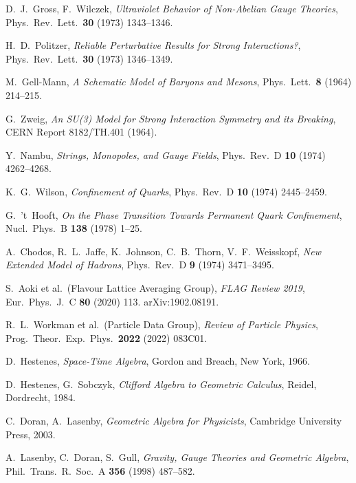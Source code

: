 \documentclass[11pt,a4paper]{article}
\theoremstyle{definition}
\theoremstyle{plain}
\theoremstyle{remark}
\begin{document}
\begin{thebibliography}{99}\setlength{\itemsep}{3pt}

D.~J.~Gross, F.~Wilczek, \emph{Ultraviolet Behavior of Non-Abelian Gauge Theories}, Phys.\ Rev.\ Lett.\ \textbf{30} (1973) 1343--1346.

H.~D.~Politzer, \emph{Reliable Perturbative Results for Strong Interactions?}, Phys.\ Rev.\ Lett.\ \textbf{30} (1973) 1346--1349.

M.~Gell-Mann, \emph{A Schematic Model of Baryons and Mesons}, Phys.\ Lett.\ \textbf{8} (1964) 214--215.

G.~Zweig, \emph{An SU(3) Model for Strong Interaction Symmetry and its Breaking}, CERN Report 8182/TH.401 (1964).

Y.~Nambu, \emph{Strings, Monopoles, and Gauge Fields}, Phys.\ Rev.\ D \textbf{10} (1974) 4262--4268.

K.~G.~Wilson, \emph{Confinement of Quarks}, Phys.\ Rev.\ D \textbf{10} (1974) 2445--2459.

G.~'t~Hooft, \emph{On the Phase Transition Towards Permanent Quark Confinement}, Nucl.\ Phys.\ B \textbf{138} (1978) 1--25.

A.~Chodos, R.~L.~Jaffe, K.~Johnson, C.~B.~Thorn, V.~F.~Weisskopf, \emph{New Extended Model of Hadrons}, Phys.\ Rev.\ D \textbf{9} (1974) 3471--3495.

S.~Aoki et al.\ (Flavour Lattice Averaging Group), \emph{FLAG Review 2019}, Eur.\ Phys.\ J.\ C \textbf{80} (2020) 113. arXiv:1902.08191.

R.~L.~Workman et al.\ (Particle Data Group), \emph{Review of Particle Physics}, Prog.\ Theor.\ Exp.\ Phys.\ \textbf{2022} (2022) 083C01.

D.~Hestenes, \emph{Space-Time Algebra}, Gordon and Breach, New York, 1966.

D.~Hestenes, G.~Sobczyk, \emph{Clifford Algebra to Geometric Calculus}, Reidel, Dordrecht, 1984.

C.~Doran, A.~Lasenby, \emph{Geometric Algebra for Physicists}, Cambridge University Press, 2003.

A.~Lasenby, C.~Doran, S.~Gull, \emph{Gravity, Gauge Theories and Geometric Algebra}, Phil.\ Trans.\ R.\ Soc.\ A \textbf{356} (1998) 487--582.


\end{thebibliography}
\end{document}
